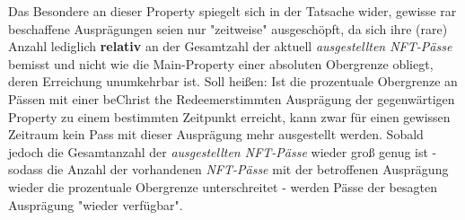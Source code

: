 \vspace{0.3cm}

Das Besondere an dieser Property spiegelt sich in der Tatsache wider, gewisse rar beschaffene Ausprägungen seien nur "zeitweise" ausgeschöpft, da sich ihre (rare) Anzahl lediglich \textbf{relativ} an der Gesamtzahl der aktuell \textit{ausgestellten NFT-Pässe} bemisst und nicht wie die Main-Property einer absoluten Obergrenze obliegt, deren Erreichung unumkehrbar ist. Soll heißen: Ist die prozentuale Obergrenze an Pässen mit einer beChrist the Redeemerstimmten Ausprägung der gegenwärtigen Property zu einem be\-stimmten Zeitpunkt erreicht, kann zwar für einen gewissen Zeitraum kein Pass mit dieser Ausprägung mehr ausgestellt werden. Sobald jedoch die Gesamtanzahl der \textit{ausgestellten NFT-Pässe} wieder groß genug ist - sodass die Anzahl der vorhandenen \textit{NFT-Pässe} mit der betroffenen Ausprägung wieder die prozentuale Obergrenze unterschreitet - werden Pässe der besagten Ausprägung "wieder verfügbar".

\vspace{0.3cm}

